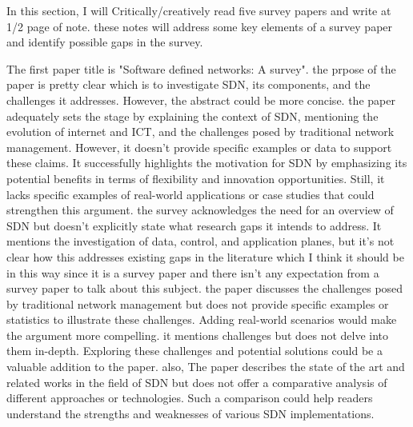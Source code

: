 \documentclass{article}
\begin{document}
\begin{tex}
In this section, I will Critically/creatively read  five survey papers and write at 1/2 page of note. these notes will address some key elements of a survey paper and identify possible gaps in the survey. 

The first paper title is "Software defined networks: A survey"\cite{masoudi2016software}. the prpose of the paper is pretty clear which is to investigate SDN, its components, and the challenges it addresses. However, the abstract could be more concise.
the paper adequately sets the stage by explaining the context of SDN, mentioning the evolution of internet and ICT, and the challenges posed by traditional network management. However, it doesn't provide specific examples or data to support these claims. It successfully highlights the motivation for SDN by emphasizing its potential benefits in terms of flexibility and innovation opportunities. Still, it lacks specific examples of real-world applications or case studies that could strengthen this argument. the survey acknowledges the need for an overview of SDN but doesn't explicitly state what research gaps it intends to address. It mentions the investigation of data, control, and application planes, but it's not clear how this addresses existing gaps in the literature which I think it should be in this way since it is a survey paper and there isn't any expectation from a survey paper to talk about this subject. the paper discusses the challenges posed by traditional network management but does not provide specific examples or statistics to illustrate these challenges. Adding real-world scenarios would make the argument more compelling. it mentions challenges but does not delve into them in-depth. Exploring these challenges and potential solutions could be a valuable addition to the paper. also, The paper describes the state of the art and related works in the field of SDN but does not offer a comparative analysis of different approaches or technologies. Such a comparison could help readers understand the strengths and weaknesses of various SDN implementations.


\end{tex}
\end{document}
